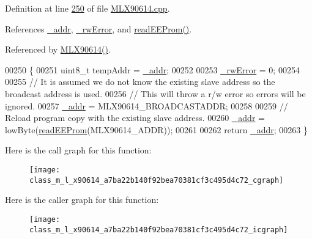 Definition at line \mbox{\hyperlink{_m_l_x90614_8cpp_source_l00250}{250}} of file \mbox{\hyperlink{_m_l_x90614_8cpp_source}{M\+L\+X90614.\+cpp}}.



References \mbox{\hyperlink{_m_l_x90614_8h_source_l00145}{\+\_\+addr}}, \mbox{\hyperlink{_m_l_x90614_8h_source_l00146}{\+\_\+rw\+Error}}, and \mbox{\hyperlink{_m_l_x90614_8cpp_source_l00344}{read\+E\+E\+Prom()}}.



Referenced by \mbox{\hyperlink{_m_l_x90614_8cpp_source_l00046}{M\+L\+X90614()}}.


\begin{DoxyCode}
00250                               \{
00251     uint8\_t tempAddr = \mbox{\hyperlink{class_m_l_x90614_a768925264f76f33f9bf98aec1cbec6a9}{\_addr}};
00252 
00253     \mbox{\hyperlink{class_m_l_x90614_a8c203cc9359c283d07682ba7dbcc5de3}{\_rwError}} = 0;
00254 
00255     \textcolor{comment}{// It is assumed we do not know the existing slave address so the broadcast address is used.}
00256     \textcolor{comment}{// This will throw a r/w error so errors will be ignored.}
00257     \mbox{\hyperlink{class_m_l_x90614_a768925264f76f33f9bf98aec1cbec6a9}{\_addr}} = MLX90614\_BROADCASTADDR;
00258 
00259     \textcolor{comment}{// Reload program copy with the existing slave address.}
00260     \mbox{\hyperlink{class_m_l_x90614_a768925264f76f33f9bf98aec1cbec6a9}{\_addr}} = lowByte(\mbox{\hyperlink{class_m_l_x90614_aab0a010875527f4ac3d2794017624b10}{readEEProm}}(MLX90614\_ADDR));
00261 
00262     \textcolor{keywordflow}{return} \mbox{\hyperlink{class_m_l_x90614_a768925264f76f33f9bf98aec1cbec6a9}{\_addr}};
00263 \}
\end{DoxyCode}
Here is the call graph for this function\+:\nopagebreak
\begin{figure}[H]
\begin{center}
\leavevmode
\texttt{[image: class\_m\_l\_x90614\_a7ba22b140f92bea70381cf3c495d4c72\_cgraph]}
\end{center}
\end{figure}
Here is the caller graph for this function\+:\nopagebreak
\begin{figure}[H]
\begin{center}
\leavevmode
\texttt{[image: class\_m\_l\_x90614\_a7ba22b140f92bea70381cf3c495d4c72\_icgraph]}
\end{center}
\end{figure}
\mbox{\label{class_m_l_x90614_a6635121e11e44f85945d18bb81d85b4f}} 
